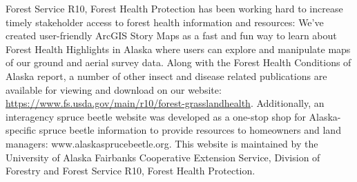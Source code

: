  Forest Service R10, Forest Health Protection has been working hard to increase timely stakeholder access to forest health information and resources: We’ve created user-friendly  ArcGIS Story Maps as a fast and fun way to learn about Forest Health Highlights in Alaska where users can explore and manipulate maps of our ground and aerial survey data. Along with the Forest Health Conditions of Alaska report, a number of other insect and disease related publications are available for viewing and download on our website: \url{https://www.fs.usda.gov/main/r10/forest-grasslandhealth}. Additionally, an interagency spruce beetle website was developed as a one-stop shop for Alaska-specific spruce beetle information to provide resources to homeowners and land managers: www.alaskasprucebeetle.org. This website is maintained by the University of Alaska Fairbanks Cooperative Extension Service,  Division of Forestry and  Forest Service R10, Forest Health Protection.


